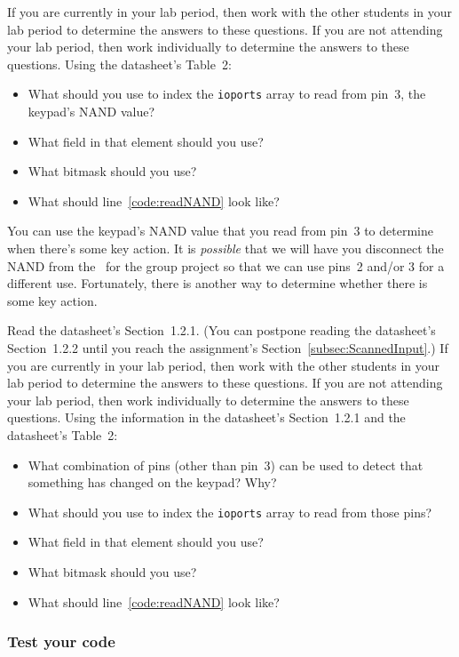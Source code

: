 If you are currently in your lab period, then work with the other students in your lab period to determine the answers to these questions.
If you are not attending your lab period, then work individually to determine the answers to these questions.
Using the datasheet's Table~2:
\begin{itemize}
    \item What should you use to index the \lstinline{ioports} array to read from pin~3, the keypad's NAND value?
    \item What field in that element should you use?
    \item What bitmask should you use?
    \item What should line~\ref{code:readNAND} look like?
\end{itemize}

You can use the keypad's NAND value that you read from pin~3 to determine when there's some key action.
It is \textit{possible} that we will have you disconnect the NAND from the \developmentboard\ for the group project so that we can use pins~2 and/or 3 for a different use.
Fortunately, there is another way to determine whether there is some key action.

Read the datasheet's Section~1.2.1.
(You can postpone reading the datasheet's Section~1.2.2 until you reach the assignment's Section~\ref{subsec:ScannedInput}.)
If you are currently in your lab period, then work with the other students in your lab period to determine the answers to these questions.
If you are not attending your lab period, then work individually to determine the answers to these questions.
Using the information in the datasheet's Section~1.2.1 and the datasheet's Table~2:
\begin{itemize}
    \item What combination of pins (other than pin~3) can be used to detect that something has changed on the keypad?
        Why?
    \item What should you use to index the \lstinline{ioports} array to read from those pins?
    \item What field in that element should you use?
    \item What bitmask should you use?
    \item What should line~\ref{code:readNAND} look like?
\end{itemize}

\subsubsection*{Test your code}

